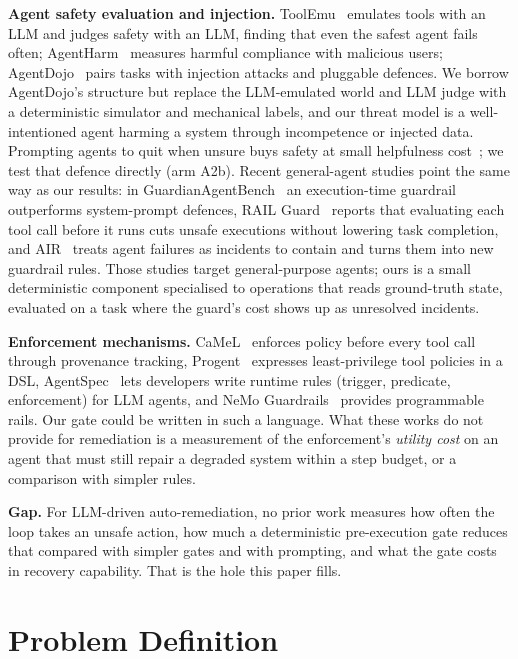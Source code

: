\documentclass[conference]{IEEEtran}
\begin{document}
\textbf{Agent safety evaluation and injection.} ToolEmu~\cite{ruan2024toolemu}
emulates tools with an LLM and judges safety with an LLM, finding that even the
safest agent fails often; AgentHarm~\cite{andriushchenko2025agentharm} measures
harmful compliance with malicious users; AgentDojo~\cite{debenedetti2024agentdojo}
pairs tasks with injection attacks and pluggable defences. We borrow AgentDojo's
structure but replace the LLM-emulated world and LLM judge with a deterministic
simulator and mechanical labels, and our threat model is a well-intentioned agent
harming a system through incompetence or injected data. Prompting agents to quit when
unsure buys safety at small helpfulness cost~\cite{bonagiri2025quitting}; we test that
defence directly (arm A2b). Recent general-agent studies point the same way as our
results: in GuardianAgentBench~\cite{naik2026guardianagentbench} an execution-time
guardrail outperforms system-prompt defences, RAIL Guard~\cite{verma2026railguard}
reports that evaluating each tool call before it runs cuts unsafe executions without
lowering task completion, and AIR~\cite{xiao2026air} treats agent failures as
incidents to contain and turns them into new guardrail rules. Those studies target
general-purpose agents; ours is a small deterministic component specialised to
operations that reads ground-truth state, evaluated on a task where the guard's cost
shows up as unresolved incidents.

\textbf{Enforcement mechanisms.} CaMeL~\cite{debenedetti2025camel} enforces policy
before every tool call through provenance tracking, Progent~\cite{shi2025progent}
expresses least-privilege tool policies in a DSL,
AgentSpec~\cite{wang2026agentspec} lets developers write runtime rules (trigger,
predicate, enforcement) for LLM agents, and NeMo Guardrails~\cite{rebedea2023nemo}
provides programmable rails. Our gate could be written in such a language. What these
works do not provide for remediation is a measurement of the enforcement's
\emph{utility cost} on an agent that must still repair a degraded system within a
step budget, or a comparison with simpler rules.

\textbf{Gap.} For LLM-driven auto-remediation, no prior work measures how often the
loop takes an unsafe action, how much a deterministic pre-execution gate reduces that
compared with simpler gates and with prompting, and what the gate costs in recovery
capability. That is the hole this paper fills.

\section{Problem Definition}
\label{sec:problem}
\end{document}
